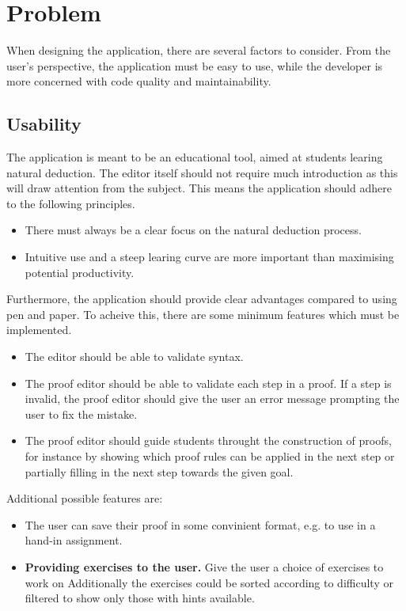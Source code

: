 \section{Problem}

When designing the application, there are several factors to consider. From the user's perspective, the application must be easy to use, while the developer is more concerned with code quality and maintainability.

\subsection{Usability}
The application is meant to be an educational tool, aimed at students learing natural deduction. The editor itself should not require much introduction as this will draw attention from the subject. This means the application should adhere to the following principles.

\begin{itemize}
      \item There must always be a clear focus on the natural deduction process.
      \item Intuitive use and a steep learing curve are more important than maximising potential productivity.
\end{itemize}

Furthermore, the application should provide clear advantages compared to using pen and paper. To acheive this, there are some minimum features which must be implemented.

\begin{itemize}
      \item The editor should be able to validate syntax.
      \item The proof editor should be able to validate each step in a proof. If a step is invalid, the proof editor should give the user an error message prompting the user to fix the mistake.
      \item The proof editor should guide students throught the construction of proofs, for instance by showing which proof rules can be applied in the next step or partially filling in the next step towards the given goal.
\end{itemize}

Additional possible features are:
\begin{itemize}
      \item The user can save their proof in some convinient format, e.g. to use in a hand-in assignment.
      \item \textbf{Providing exercises to the user.} Give the user a choice of exercises to work on Additionally the exercises could be sorted according to difficulty or filtered to show only those with hints available.
\end{itemize}

